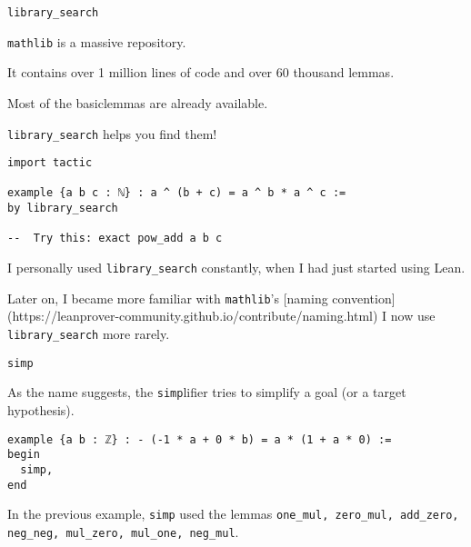 \documentclass{beamer}
\begin{document}
\begin{frame}[fragile]{{\texttt{library\_search}}}

{\verb`mathlib`} is a massive repository.

It contains over 1 million lines of code and over 60 thousand lemmas.

Most of the basic\footnotemark lemmas are already available.

{\verb`library_search`} helps you find them!

\begin{verbatim}
import tactic

example {a b c : ℕ} : a ^ (b + c) = a ^ b * a ^ c :=
by library_search

--  Try this: exact pow_add a b c
\end{verbatim}

\end{frame}

\begin{frame}[fragile]

I personally used {\verb`library_search`} constantly, when I had just started using Lean.

Later on, I became more familiar with {\verb`mathlib`}'s [naming convention](https://leanprover-community.github.io/contribute/naming.html) I now use {\verb`library_search`} more rarely.
\end{frame}

\begin{frame}[fragile]{{\texttt{simp}}}

As the name suggests, the {\verb`simp`}lifier tries to simplify a goal (or a target hypothesis).

\begin{verbatim}
example {a b : ℤ} : - (-1 * a + 0 * b) = a * (1 + a * 0) :=
begin
  simp,
end
\end{verbatim}
In the previous example, {\verb`simp`} used the lemmas {\verb`one_mul, zero_mul, add_zero, neg_neg, mul_zero, mul_one, neg_mul`}.
\end{frame}
\end{document}
